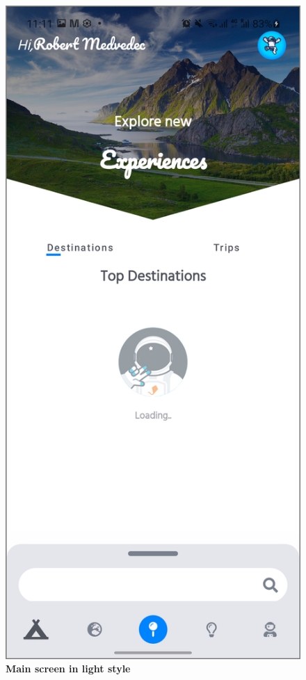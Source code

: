\begin{figure}[!htb]
\centering
\begin{minipage}{.48\textwidth}
\centering
\includegraphics[width=.9\textwidth]{../Images/UI/MainLight.jpg}
\caption{\label{fig:dbapiuser}\textbf{Main screen in light style}}

\end{minipage}
\end{figure}
